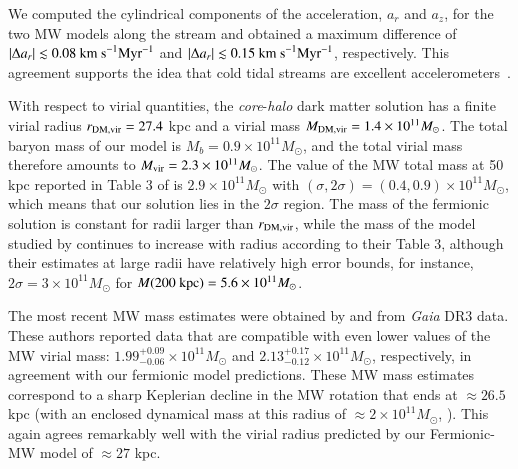 \documentclass[referee]{aa} %
\begin{document}
We computed the cylindrical components of the acceleration, $a_r$ and $a_z$,
for the two MW models along the stream and obtained a maximum difference of $|\Delta a_r| \lesssim 0.08 \rm{~km~s}^{-1} \rm{Myr}^{-1}$ and $|\Delta a_r| \lesssim 0.15 \rm{~km~s}^{-1} \rm{Myr}^{-1}$, respectively. This agreement supports  the idea that cold tidal streams are excellent accelerometers~\citep{Ibata_2016,2022ApJ...940...22N,2023ApJ...945L..32C}.

With respect to virial quantities, the \textit{core}-\textit{halo} dark matter solution has a finite virial radius $r_{\rm{DM,vir}}=27.4$ kpc and a virial mass
$M_{\rm{DM,vir}}=1.4\times10^{11} M_\odot$. The total baryon mass of our model is $M_b=0.9\times10^{11}M_\odot$, and the total virial mass therefore amounts to
$M_{\rm{vir}}=2.3\times10^{11} M_\odot$. The value of the MW total mass at 50 kpc reported in Table 3
of \citet{2014MNRAS.445.3788G} is $2.9\times10^{11} M_\odot$ with $(\sigma, 2\sigma)=(0.4,0.9)\times10^{11} M_\odot$, which means that our solution lies in the $2\sigma$ region.
The mass of the fermionic solution is constant for radii larger than
$r_{\rm{DM,vir}}$, while the mass of the model studied by \citet{2014MNRAS.445.3788G} continues to increase with radius according to their Table 3, although their estimates at large radii have relatively
high error bounds, for instance, $2\sigma=3\times10^{11} M_\odot$ for $M(200 \hbox{ kpc}) =5.6\times10^{11} M_\odot$.

The most recent MW mass estimates were obtained by
\citet{Jiao2023} and \citet{Ou2023} from \textit{Gaia} DR3 data. These authors reported data that are compatible with even lower values of the MW virial mass: $1.99^{+0.09}_{-0.06}\times10^{11} M_\odot$ and $2.13^{+0.17}_{-0.12}\times10^{11} M_\odot$, respectively, in agreement with our fermionic model predictions. These MW mass estimates correspond to a sharp Keplerian decline in the MW rotation that ends at $\approx 26.5$ kpc (with an enclosed dynamical mass at this radius of $\approx 2\times 10^{11} M_\odot$, \citealp{Jiao2023}). This again agrees remarkably well with the virial radius predicted by our Fermionic-MW model of $\approx 27$ kpc.
\end{document}
